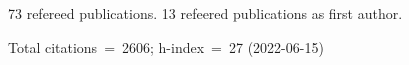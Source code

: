 73 refereed publications. 13 refeered publications as first author.

Total citations~=~2606; h-index~=~27 (2022-06-15)